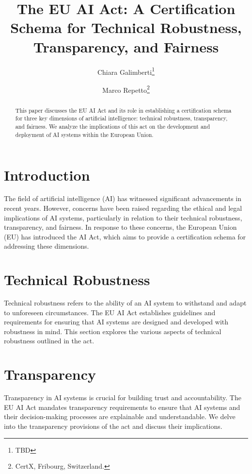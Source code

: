 \documentclass{article}
\title{The EU AI Act: A Certification Schema for Technical Robustness, Transparency, and Fairness}
\author{Chiara Galimberti\thanks{TBD} \and Marco Repetto\thanks{CertX, Fribourg, Switzerland.}}
\begin{document}
	
\maketitle


\begin{abstract}

This paper discusses the EU AI Act and its role in establishing a certification schema for three key dimensions of artificial intelligence: technical robustness, transparency, and fairness. We analyze the implications of this act on the development and deployment of AI systems within the European Union.

\end{abstract}


\section{Introduction}

The field of artificial intelligence (AI) has witnessed significant advancements in recent years. However, concerns have been raised regarding the ethical and legal implications of AI systems, particularly in relation to their technical robustness, transparency, and fairness. In response to these concerns, the European Union (EU) has introduced the AI Act, which aims to provide a certification schema for addressing these dimensions.


\section{Technical Robustness}

Technical robustness refers to the ability of an AI system to withstand and adapt to unforeseen circumstances. The EU AI Act establishes guidelines and requirements for ensuring that AI systems are designed and developed with robustness in mind. This section explores the various aspects of technical robustness outlined in the act.


\section{Transparency}

Transparency in AI systems is crucial for building trust and accountability. The EU AI Act mandates transparency requirements to ensure that AI systems and their decision-making processes are explainable and understandable. We delve into the transparency provisions of the act and discuss their implications.
\end{document}
